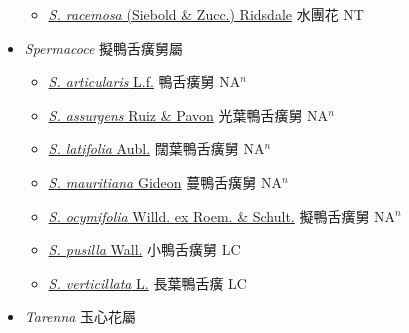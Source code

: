 \begin{itemize}
  \begin{itemize}
        \item[] \href{http://www.theplantlist.org/tpl1.1/search?q=Sinoadina+racemosa}{\textit{S. racemosa} (Siebold \& Zucc.) Ridsdale}   水團花 NT
  \end{itemize}
 \item[] \textit{Spermacoce} 擬鴨舌癀舅屬
                    
  \begin{itemize}
        \item[] \href{http://www.theplantlist.org/tpl1.1/search?q=Spermacoce+articularis}{\textit{S. articularis} L.f.}   鴨舌癀舅 NA$^n$
        \item[] \href{http://www.theplantlist.org/tpl1.1/search?q=Spermacoce+assurgens}{\textit{S. assurgens} Ruiz \& Pavon}   光葉鴨舌癀舅 NA$^n$
        \item[] \href{http://www.theplantlist.org/tpl1.1/search?q=Spermacoce+latifolia}{\textit{S. latifolia} Aubl.}   闊葉鴨舌癀舅 NA$^n$
        \item[] \href{http://www.theplantlist.org/tpl1.1/search?q=Spermacoce+mauritiana}{\textit{S. mauritiana} Gideon}   蔓鴨舌癀舅 NA$^n$
        \item[] \href{http://www.theplantlist.org/tpl1.1/search?q=Spermacoce+ocymifolia}{\textit{S. ocymifolia} Willd. ex Roem. \& Schult.}   擬鴨舌癀舅 NA$^n$
        \item[] \href{http://www.theplantlist.org/tpl1.1/search?q=Spermacoce+pusilla}{\textit{S. pusilla} Wall.}   小鴨舌癀舅 LC
        \item[] \href{http://www.theplantlist.org/tpl1.1/search?q=Spermacoce+verticillata}{\textit{S. verticillata} L.}   長葉鴨舌癀 LC
  \end{itemize}
 \item[] \textit{Tarenna} 玉心花屬
                    

\end{itemize}
